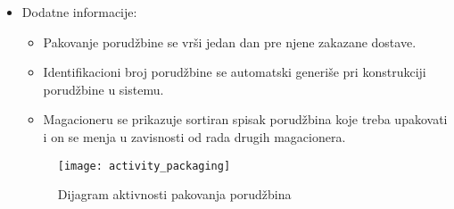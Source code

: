 \begin{itemize}
\begin{enumerate}
		\end{enumerate}
		\item{Dodatne informacije:}
		\begin{itemize}
		    \item{Pakovanje porudžbine se vrši jedan dan pre njene zakazane dostave.}
			\item{Identifikacioni broj porudžbine se automatski generiše pri konstrukciji porudžbine u sistemu.}
			\item{Magacioneru se prikazuje sortiran spisak porudžbina koje treba upakovati i on se menja u zavisnosti od rada drugih magacionera. }
		\end{itemize}
	\begin{figure}[H]
		\begin{center}
			\texttt{[image: activity\_packaging]}
			\caption{Dijagram aktivnosti pakovanja porudžbina}		
		\end{center}
	\end{figure}
	\end{itemize}
